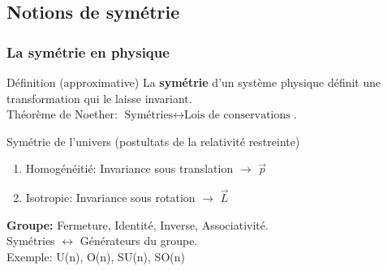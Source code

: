 \documentclass[handout]{beamer}
\begin{document}
\subsection{Notions de symétrie}
\begin{frame}\frametitle{La symétrie en physique}
\begin{block}{Définition (approximative)}
La \textbf{symétrie} d'un système physique définit une transformation qui le laisse invariant.\\
Théorème de Noether: $\text{Symétries} \leftrightarrow \text{Lois de conservations}$.
\end{block}


\begin{exampleblock}{Symétrie de l'univers (postultats de la relativité restreinte)}
\begin{enumerate}
\item Homogénéitié: Invariance sous translation $\rightarrow$ $\vec{p}$ 
\item Isotropie: Invariance sous rotation $\rightarrow$ $\vec{L}$
\end{enumerate}
\end{exampleblock}
\textbf{Groupe:} Fermeture, Identité, Inverse, Associativité.\\  Symétries $\leftrightarrow$ Générateurs du groupe.\\
Exemple: U(n), O(n), SU(n), SO(n)
\end{frame}
\end{document}
